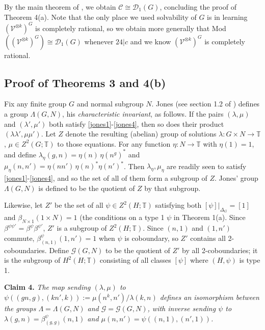 \documentclass[12pt]{article}
\numberwithin{equation}{section}
\def\cC            {{\mathcal{C}}}
\def\cD            {{\mathcal{D}}}
\def\cG            {{\mathcal{G}}}
\def\cV            {{\mathcal{V}}}
\def\bbT           {\mathbb{T}}
\begin{document}
By the main theorem of \cite{Kir}, we obtain $\cC\cong\cD_1(G)$, concluding the proof of Theorem 4(a). Note that the only place we used solvability of $G$ is in learning $(\cV^{\otimes k})^G$ is completely rational, so we obtain more generally that Mod$((\cV^{\otimes k})^G)\cong \cD_1(G)$ whenever $24|c$ and we know $(\cV^{\otimes k})^G$ is completely rational.

\subsection{Proof of Theorems 3 and 4(b)}

Fix any  finite group $G$ and normal subgroup $N$. Jones (see section 1.2 of \cite{Jon2}) defines a group $\Lambda(G,N)$, his \textit{characteristic invariant}, as follows. If the pairs $(\lambda,\mu)$ and $(\lambda',\mu')$ both satisfy \eqref{jones1}-\eqref{jones4},
then so does their product $(\lambda\lambda',\mu\mu')$. Let $Z$ denote the resulting (abelian) group 
of solutions $\lambda:G\times N\rightarrow\bbT$, $\mu\in Z^2(G;\bbT)$ to those equations. 
For any function $\eta:N\rightarrow\bbT$ with $\eta(1)=1$, and define $\lambda_\eta(g,n)=\eta(n)\,\eta(n^g)^*$ and $\mu_\eta(n,n')=\eta(nn')\,\eta(n)^*\eta(n')^*$. Then $\lambda_\eta,\mu_\eta$ are readily
seen to satisfy  \eqref{jones1}-\eqref{jones4}, and so the set of all of them form a subgroup of $Z$. Jones' group
$\Lambda(G,N)$ is defined to be the quotient of $Z$ by that subgroup.

Likewise, let $Z'$ be the set of all $\psi\in Z^2(H;\bbT)$ satisfying both $[\psi]|_{\Delta_G}=[1]$ and $\beta_{N\times 1}(1\times N)=1$ (the conditions on a type 1 $\psi$ in Theorem 1(a). Since $\beta^{\psi\psi'}=\beta^\psi\beta^{\psi'}$, $Z'$ is a subgroup of $Z^2(H;\bbT)$. Since $(n,1)$ and $(1,n')$ commute, $\beta^\psi_{(n,1)}(1,n')=1$ when 
$\psi$ is coboundary, so $Z'$ contains all 2-coboundaries. Define $\cG(G,N)$ to be the quotient of $Z'$ by all 2-coboundaries; it is the subgroup of $H^2(H;\bbT)$ consisting of all classes $[\psi]$ where
$(H,\psi)$ is type 1.


\medskip\noindent\textbf{Claim 4.} \textit{The map sending $(\lambda,\mu)$ to $\psi((gn,g),(kn',k)):=\mu(n^k,n')/\lambda(k,n)$ defines an isomorphism between the groups $\Lambda=\Lambda(G,N)$ and $\cG=\cG(G,N)$, with inverse sending $\psi$ to $\lambda(g,n)=\beta^\psi_{(g,g)}(n,1)$ and $\mu(n,n')=\psi((n,1),(n',1))$.}\medskip
\end{document}
